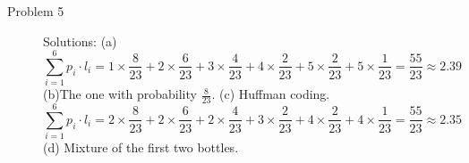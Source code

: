 \documentclass[11pt]{article}
\begin{document}
\begin{description}
    \item[Problem 5] Solutions:
        \subitem(a)\[
\sum_{i=1}^{6} p_i \cdot l_i = 1 \times \frac{8}{23} + 2 \times \frac{6}{23} + 3 \times \frac{4}{23} + 4 \times \frac{2}{23} + 5 \times \frac{2}{23} + 5 \times \frac{1}{23} = \frac{55}{23} \approx 2.39
\]
        \subitem(b)The one with probability $\frac{8}{23}$.
        \subitem(c) Huffman coding.\[\sum_{i=1}^{6} p_i \cdot l_i = 2 \times \frac{8}{23} + 2 \times \frac{6}{23} + 2 \times \frac{4}{23} + 3 \times \frac{2}{23} + 4 \times \frac{2}{23} + 4 \times \frac{1}{23} = \frac{55}{23} \approx 2.35
\]
        \subitem(d) Mixture of the first two bottles.

\end{description}
\end{document}
